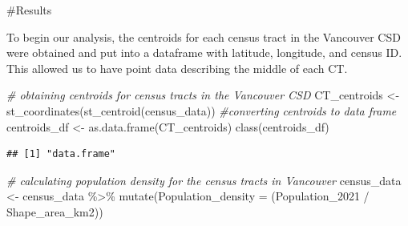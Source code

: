 \documentclass[
]{article}
\newenvironment{Shaded}{\begin{snugshade}}{\end{snugshade}}
\newcommand{\AttributeTok}[1]{\textcolor[rgb]{0.77,0.63,0.00}{#1}}
\newcommand{\CommentTok}[1]{\textcolor[rgb]{0.56,0.35,0.01}{\textit{#1}}}
\newcommand{\FunctionTok}[1]{\textcolor[rgb]{0.00,0.00,0.00}{#1}}
\newcommand{\NormalTok}[1]{#1}
\newcommand{\OtherTok}[1]{\textcolor[rgb]{0.56,0.35,0.01}{#1}}
\newcommand{\SpecialCharTok}[1]{\textcolor[rgb]{0.00,0.00,0.00}{#1}}
\newcommand{\StringTok}[1]{\textcolor[rgb]{0.31,0.60,0.02}{#1}}
\begin{document}
\#Results

To begin our analysis, the centroids for each census tract in the
Vancouver CSD were obtained and put into a dataframe with latitude,
longitude, and census ID. This allowed us to have point data describing
the middle of each CT.

\begin{Shaded}
\begin{Highlighting}[]
\CommentTok{\# obtaining centroids for census tracts in the Vancouver CSD }
\NormalTok{CT\_centroids }\OtherTok{\textless{}{-}} \FunctionTok{st\_coordinates}\NormalTok{(}\FunctionTok{st\_centroid}\NormalTok{(census\_data))}
\CommentTok{\#converting centroids to data frame}
\NormalTok{centroids\_df }\OtherTok{\textless{}{-}} \FunctionTok{as.data.frame}\NormalTok{(CT\_centroids)}
\FunctionTok{class}\NormalTok{(centroids\_df)}
\end{Highlighting}
\end{Shaded}

\begin{verbatim}
## [1] "data.frame"
\end{verbatim}

\begin{Shaded}
\end{Shaded}

\begin{Shaded}
\begin{Highlighting}[]
\CommentTok{\# calculating population density for the census tracts in Vancouver}
\NormalTok{census\_data }\OtherTok{\textless{}{-}}\NormalTok{ census\_data }\SpecialCharTok{\%\textgreater{}\%}
  \FunctionTok{mutate}\NormalTok{(}\AttributeTok{Population\_density =}
\NormalTok{           (Population\_2021 }\SpecialCharTok{/}\NormalTok{ Shape\_area\_km2))}
\end{Highlighting}
\end{Shaded}
\end{document}
